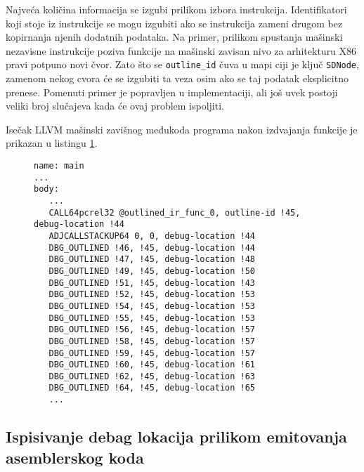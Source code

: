 \documentclass[12pt,oneside]{memoir}
\begin{document}
Najveća količina informacija se izgubi prilikom izbora instrukcija.
Identifikatori koji stoje iz instrukcije se mogu izgubiti ako se instrukcija zameni drugom bez kopirnanja njenih dodatnih podataka.
Na primer, prilikom spustanja mašinski nezavisne instrukcije poziva funkcije na mašinski zavisan nivo za arhitekturu X86 pravi potpuno novi čvor.
Zato što se \verb|outline_id| čuva u mapi ciji je ključ \verb|SDNode|, zamenom nekog cvora će se izgubiti ta veza osim ako se taj podatak eksplicitno prenese.
Pomenuti primer je popravljen u implementaciji, ali još uvek postoji veliki broj slučajeva kada će ovaj problem ispoljiti.


Isečak LLVM mašinski zavišnog međukoda programa nakon izdvajanja funkcije je prikazan u listingu \ref{lst:outlining_mir_example}.

\begin{figure}
\begin{verbatim}
name: main
...
body:
   ...
   CALL64pcrel32 @outlined_ir_func_0, outline-id !45, debug-location !44
   ADJCALLSTACKUP64 0, 0, debug-location !44
   DBG_OUTLINED !46, !45, debug-location !44
   DBG_OUTLINED !47, !45, debug-location !48
   DBG_OUTLINED !49, !45, debug-location !50
   DBG_OUTLINED !51, !45, debug-location !43
   DBG_OUTLINED !52, !45, debug-location !53
   DBG_OUTLINED !54, !45, debug-location !53
   DBG_OUTLINED !55, !45, debug-location !53
   DBG_OUTLINED !56, !45, debug-location !57
   DBG_OUTLINED !58, !45, debug-location !57
   DBG_OUTLINED !59, !45, debug-location !57
   DBG_OUTLINED !60, !45, debug-location !61
   DBG_OUTLINED !62, !45, debug-location !63
   DBG_OUTLINED !64, !45, debug-location !65
   ...
\end{verbatim}
\label{lst:outlining_mir_example}
\caption{}
\end{figure}

\subsection{Ispisivanje debag lokacija prilikom emitovanja asemblerskog koda}


\end{document}
